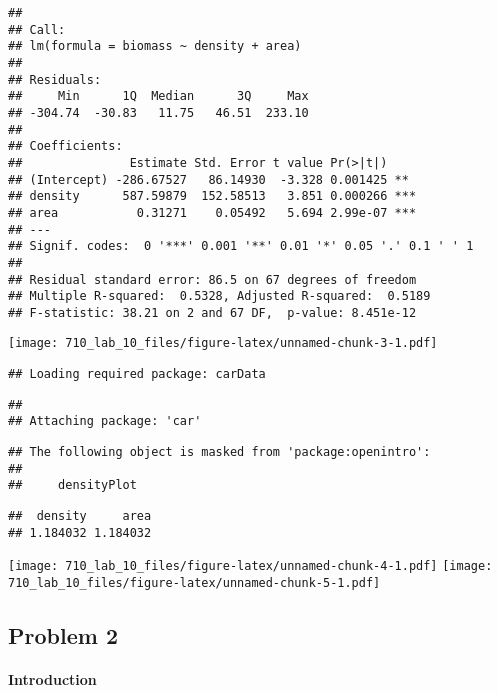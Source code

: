 \documentclass[]{article}
\let\oldparagraph\paragraph
\renewcommand{\paragraph}[1]{\oldparagraph{#1}\mbox{}}
\begin{document}
\begin{verbatim}
## 
## Call:
## lm(formula = biomass ~ density + area)
## 
## Residuals:
##     Min      1Q  Median      3Q     Max 
## -304.74  -30.83   11.75   46.51  233.10 
## 
## Coefficients:
##               Estimate Std. Error t value Pr(>|t|)    
## (Intercept) -286.67527   86.14930  -3.328 0.001425 ** 
## density      587.59879  152.58513   3.851 0.000266 ***
## area           0.31271    0.05492   5.694 2.99e-07 ***
## ---
## Signif. codes:  0 '***' 0.001 '**' 0.01 '*' 0.05 '.' 0.1 ' ' 1
## 
## Residual standard error: 86.5 on 67 degrees of freedom
## Multiple R-squared:  0.5328, Adjusted R-squared:  0.5189 
## F-statistic: 38.21 on 2 and 67 DF,  p-value: 8.451e-12
\end{verbatim}

\texttt{[image: 710\_lab\_10\_files/figure-latex/unnamed-chunk-3-1.pdf]}

\begin{verbatim}
## Loading required package: carData
\end{verbatim}

\begin{verbatim}
## 
## Attaching package: 'car'
\end{verbatim}

\begin{verbatim}
## The following object is masked from 'package:openintro':
## 
##     densityPlot
\end{verbatim}

\begin{verbatim}
##  density     area 
## 1.184032 1.184032
\end{verbatim}

\texttt{[image: 710\_lab\_10\_files/figure-latex/unnamed-chunk-4-1.pdf]}
\texttt{[image: 710\_lab\_10\_files/figure-latex/unnamed-chunk-5-1.pdf]}

\subsection{Problem 2}\label{problem-2}

\paragraph{Introduction}\label{introduction-1}
\end{document}
